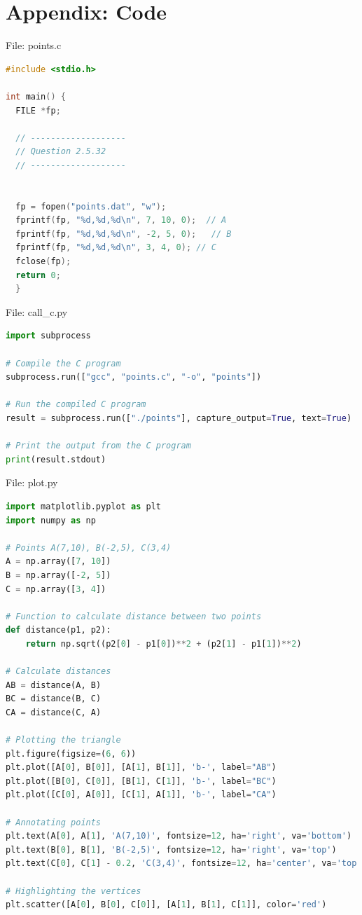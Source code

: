 \documentclass{beamer}
\numberwithin{equation}{section}
\theoremstyle{remark}
\begin{document}
\section*{Appendix: Code}

\begin{frame}[fragile]{File: points.c}
\begin{lstlisting}[language=C]
#include <stdio.h>

int main() {
  FILE *fp;

  // -------------------
  // Question 2.5.32
  // -------------------


  fp = fopen("points.dat", "w");
  fprintf(fp, "%d,%d,%d\n", 7, 10, 0);  // A
  fprintf(fp, "%d,%d,%d\n", -2, 5, 0);   // B
  fprintf(fp, "%d,%d,%d\n", 3, 4, 0); // C
  fclose(fp);
  return 0;
  }
\end{lstlisting}
\end{frame}

\begin{frame}[fragile]{File: call\_c.py}
\begin{lstlisting}[language=Python]
import subprocess

# Compile the C program
subprocess.run(["gcc", "points.c", "-o", "points"])

# Run the compiled C program
result = subprocess.run(["./points"], capture_output=True, text=True)

# Print the output from the C program
print(result.stdout)
\end{lstlisting}
\end{frame}

\begin{frame}[fragile]{File: plot.py}
\begin{lstlisting}[language=Python]
import matplotlib.pyplot as plt
import numpy as np

# Points A(7,10), B(-2,5), C(3,4)
A = np.array([7, 10])
B = np.array([-2, 5])
C = np.array([3, 4])

# Function to calculate distance between two points
def distance(p1, p2):
    return np.sqrt((p2[0] - p1[0])**2 + (p2[1] - p1[1])**2)

# Calculate distances
AB = distance(A, B)
BC = distance(B, C)
CA = distance(C, A)

# Plotting the triangle
plt.figure(figsize=(6, 6))
plt.plot([A[0], B[0]], [A[1], B[1]], 'b-', label="AB")
plt.plot([B[0], C[0]], [B[1], C[1]], 'b-', label="BC")
plt.plot([C[0], A[0]], [C[1], A[1]], 'b-', label="CA")

# Annotating points
plt.text(A[0], A[1], 'A(7,10)', fontsize=12, ha='right', va='bottom')
plt.text(B[0], B[1], 'B(-2,5)', fontsize=12, ha='right', va='top')
plt.text(C[0], C[1] - 0.2, 'C(3,4)', fontsize=12, ha='center', va='top')

# Highlighting the vertices
plt.scatter([A[0], B[0], C[0]], [A[1], B[1], C[1]], color='red')
\end{lstlisting}
\end{frame}
\end{document}
